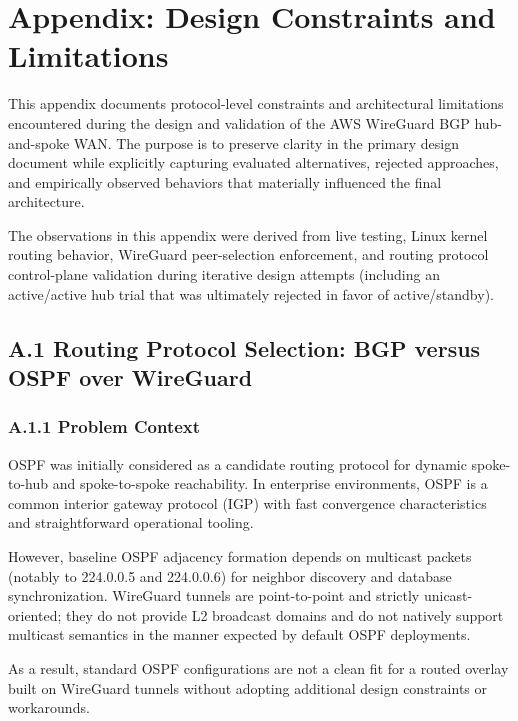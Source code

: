 \documentclass[11pt]{article}
\begin{document}
\section{Appendix: Design Constraints and Limitations}
\label{sec:appendix-design-constraints}

This appendix documents protocol-level constraints and architectural limitations encountered during the design and validation of the AWS WireGuard BGP hub-and-spoke WAN. The purpose is to preserve clarity in the primary design document while explicitly capturing evaluated alternatives, rejected approaches, and empirically observed behaviors that materially influenced the final architecture.

The observations in this appendix were derived from live testing, Linux kernel routing behavior, WireGuard peer-selection enforcement, and routing protocol control-plane validation during iterative design attempts (including an active/active hub trial that was ultimately rejected in favor of active/standby).

\subsection{A.1 Routing Protocol Selection: BGP versus OSPF over WireGuard}
\label{subsec:a1-routing-protocol-selection}

\subsubsection{A.1.1 Problem Context}
\label{subsubsec:a1-problem-context}

OSPF was initially considered as a candidate routing protocol for dynamic spoke-to-hub and spoke-to-spoke reachability. In enterprise environments, OSPF is a common interior gateway protocol (IGP) with fast convergence characteristics and straightforward operational tooling.

However, baseline OSPF adjacency formation depends on multicast packets (notably to 224.0.0.5 and 224.0.0.6) for neighbor discovery and database synchronization. WireGuard tunnels are point-to-point and strictly unicast-oriented; they do not provide L2 broadcast domains and do not natively support multicast semantics in the manner expected by default OSPF deployments.

As a result, standard OSPF configurations are not a clean fit for a routed overlay built on WireGuard tunnels without adopting additional design constraints or workarounds.
\end{document}
